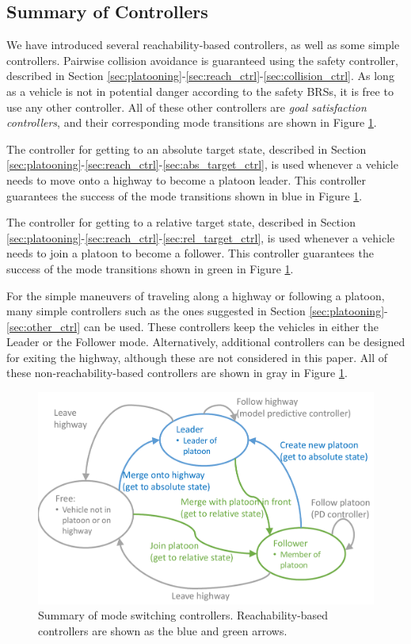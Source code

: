 \subsection{Summary of Controllers}
We have introduced several reachability-based controllers, as well as some simple controllers. Pairwise collision avoidance is guaranteed using the safety controller, described in Section \ref{sec:platooning}-\ref{sec:reach_ctrl}-\ref{sec:collision_ctrl}. As long as a vehicle is not in potential danger according to the safety BRSs, it is free to use any other controller. All of these other controllers are \textit{goal satisfaction controllers}, and their corresponding mode transitions are shown in Figure \ref{fig:modeControllers}.

The controller for getting to an absolute target state, described in Section \ref{sec:platooning}-\ref{sec:reach_ctrl}-\ref{sec:abs_target_ctrl}, is used whenever a vehicle needs to move onto a highway to become a platoon leader. This controller guarantees the success of the mode transitions shown in blue in Figure \ref{fig:modeControllers}.

The controller for getting to a relative target state, described in Section \ref{sec:platooning}-\ref{sec:reach_ctrl}-\ref{sec:rel_target_ctrl}, is used whenever a vehicle needs to join a platoon to become a follower. This controller guarantees the success of the mode transitions shown in green in Figure \ref{fig:modeControllers}.

For the simple maneuvers of traveling along a highway or following a platoon, many simple controllers such as the ones suggested in Section \ref{sec:platooning}-\ref{sec:other_ctrl} can be used. These controllers keep the vehicles in either the Leader or the Follower mode. Alternatively, additional controllers can be designed for exiting the highway, although these are not considered in this paper. All of these non-reachability-based controllers are shown in gray in Figure \ref{fig:modeControllers}.

\begin{figure}
	\centering
	\includegraphics[width=0.75\columnwidth]{"modeControllers"}
	\caption{Summary of mode switching controllers. Reachability-based controllers are shown as the blue and green arrows.}
	\label{fig:modeControllers}
\end{figure}